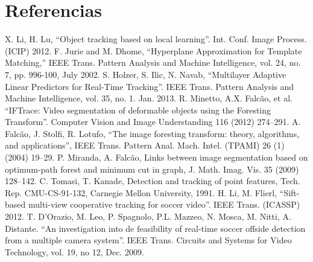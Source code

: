 \documentclass[twocolumn,a4paper,10pt]{article}
\begin{document}

\section*{Referencias}
\begin{thebibliography}{99}
     X. Li, H. Lu, ``Object tracking based on local learning''. Int. Conf. Image Process. (ICIP) 2012.
     F. Jurie and M. Dhome, “Hyperplane Approximation for Template Matching,” IEEE Trans. Pattern Analysis and Machine Intelligence, vol. 24, no. 7, pp. 996-100, July 2002.
     S. Holzer, S. Ilic, N. Navab, ``Multilayer Adaptive Linear Predictors for Real-Time Tracking''. 
                  IEEE Trans. Pattern Analysis and Machine Intelligence, vol. 35, no. 1. Jan. 2013.
     R. Minetto, A.X. Falcão, et al. ``IFTrace: Video segmentation of deformable objects using the Foresting Transform''. 
                      Computer Vision and Image Understanding 116 (2012) 274–291.
     A. Falcão, J. Stolfi, R. Lotufo, ``The image foresting transform: theory, algorithms, and applications'', IEEE Trans. Pattern Anal. Mach. Intel. (TPAMI) 26 (1) (2004) 19–29.
     P. Miranda, A. Falcão, Links between image segmentation based on optimum-path forest and minimum cut in graph, J. Math. Imag. Vis. 35 (2009) 128–142.
     C. Tomasi, T. Kanade, Detection and tracking of point features, Tech. Rep. CMU-CS-91-132, Carnegie Mellon University, 1991.
     H. Li, M. Flierl, ``Sift-based multi-view cooperative tracking for soccer video''. IEEE Trans. (ICASSP) 2012.
     T. D'Orazio, M. Leo, P. Spagnolo, P.L. Mazzeo, N. Mosca, M. Nitti, A. Distante. ``An investigation into de feasibility of real-time soccer offside detection
                            from a multiple camera system''. IEEE Trans. Circuits and Systems for Video Technology, vol. 19, no 12, Dec. 2009.


\end{thebibliography}
\end{document}
